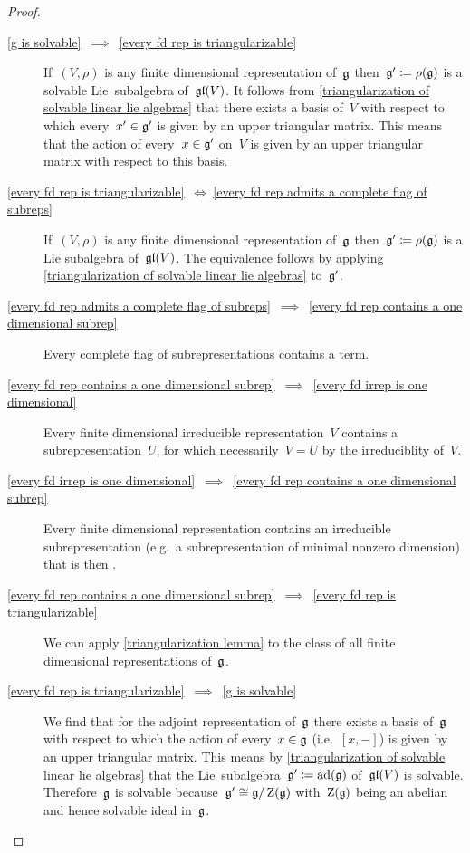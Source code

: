 \begin{proof}
  \leavevmode
  \begin{description}
    \item[\ref*{g is solvable}~$\implies$~\ref*{every fd rep is triangularizable}]
      If~$(V, \rho)$ is any finite dimensional representation of~$\mathfrak{g}$ then~$\mathfrak{g}' \coloneqq \rho(\mathfrak{g})$ is a solvable Lie~subalgebra of~$\mathfrak{gl}(V)$.
      It follows from \cref{triangularization of solvable linear lie algebras} that there exists a basis of~$V$ with respect to which every~$x' \in \mathfrak{g}'$ is given by an upper triangular matrix.
      This means that the action of every~$x \in \mathfrak{g}'$ on~$V$ is given by an upper triangular matrix with respect to this basis.
    \item[\ref*{every fd rep is triangularizable}~$\iff~$\ref*{every fd rep admits a complete flag of subreps}]
      If~$(V, \rho)$ is any finite dimensional representation of~$\mathfrak{g}$ then~$\mathfrak{g}' \coloneqq \rho(\mathfrak{g})$ is a Lie subalgebra of~$\mathfrak{gl}(V)$.
      The equivalence follows by applying \cref{triangularization of solvable linear lie algebras} to~$\mathfrak{g}'$.
    \item[\ref*{every fd rep admits a complete flag of subreps}~$\implies$~\ref*{every fd rep contains a one dimensional subrep}]
      Every complete flag of subrepresentations contains a {\onedimensional} term.
    \item[\ref*{every fd rep contains a one dimensional subrep}~$\implies$~\ref*{every fd irrep is one dimensional}]
      Every finite dimensional irreducible representation~$V$ contains a {\onedimensional} subrepresentation~$U$, for which necessarily~$V = U$ by the irreduciblity of~$V$.
    \item[\ref*{every fd irrep is one dimensional}~$\implies$~\ref*{every fd rep contains a one dimensional subrep}]
      Every finite dimensional representation contains an irreducible subrepresentation (e.g.\ a subrepresentation of minimal nonzero dimension) that is then {\onedimensional}.
    \item[\ref*{every fd rep contains a one dimensional subrep}~$\implies$~\ref*{every fd rep is triangularizable}]
      We can apply \cref{triangularization lemma} to the class of all finite dimensional representations of~$\mathfrak{g}$.
    \item[\ref*{every fd rep is triangularizable}~$\implies$~\ref*{g is solvable}]
      We find that for the adjoint representation of~$\mathfrak{g}$ there exists a basis of~$\mathfrak{g}$ with respect to which the action of every~$x \in \mathfrak{g}$ (i.e.~$[x,-]$) is given by an upper triangular matrix.
      This means by \cref{triangularization of solvable linear lie algebras} that the Lie~subalgebra~$\mathfrak{g}' \coloneqq \operatorname{ad}(\mathfrak{g})$ of~$\mathfrak{gl}(V)$ is solvable.
      Therefore~$\mathfrak{g}$ is solvable because~$\mathfrak{g}' \cong \mathfrak{g}/\operatorname{Z}(\mathfrak{g})$ with~$\operatorname{Z}(\mathfrak{g})$ being an abelian and hence solvable ideal in~$\mathfrak{g}$.
    \qedhere
  \end{description}
\end{proof}


